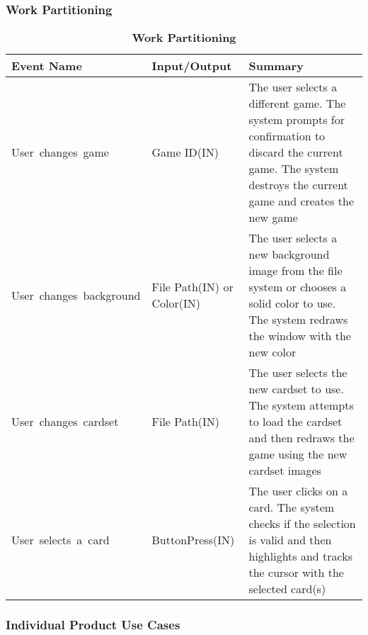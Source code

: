 \documentclass[12pt, titlepage]{article}
\begin{document}
		\subsubsection{Work Partitioning}
		\begin{table}[!htp]
		\caption{\bf Work Partitioning}
			\begin{tabularx}{\textwidth}{|l|X|X|}
			\toprule {\bf Event Name} & {\bf Input/Output} & {\bf Summary}\\
			\midrule			
			\mbox{User changes game} & Game ID(IN) & The user selects a different game.
			The system prompts for confirmation to discard the current game. The system
			destroys the current game and creates the new game\\
			\hline
			\mbox{User changes background} & File Path(IN) \newline or Color(IN) & 
			The user selects a new background image from the file system or chooses
			a solid color to use. The system redraws the window with the new color\\
			\hline
			\mbox{User changes cardset} & File Path(IN) & The user selects the new
			cardset to use. The system attempts to load the cardset and then redraws the
			game using the new cardset images\\
			\hline
			\mbox{User selects a card} & ButtonPress(IN) & The user clicks on a card. The
			system checks if the selection is valid and then highlights and tracks the
			cursor with the selected card(s)\\
			\bottomrule
			\end{tabularx}
		\end{table}
		\subsubsection{Individual Product Use Cases}
\end{document}
